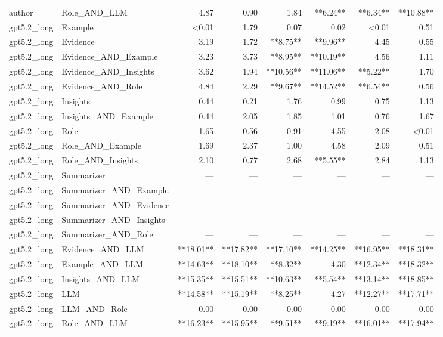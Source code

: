 \begin{tabular}{llrrrrrr}
author & Role_AND_LLM & 4.87 & 0.90 & 1.84 & **6.24** & **6.34** & **10.88** \\
gpt5.2_long & Example & <0.01 & 1.79 & 0.07 & 0.02 & <0.01 & 0.51 \\
gpt5.2_long & Evidence & 3.19 & 1.72 & **8.75** & **9.96** & 4.45 & 0.55 \\
gpt5.2_long & Evidence_AND_Example & 3.23 & 3.73 & **8.95** & **10.19** & 4.56 & 1.11 \\
gpt5.2_long & Evidence_AND_Insights & 3.62 & 1.94 & **10.56** & **11.06** & **5.22** & 1.70 \\
gpt5.2_long & Evidence_AND_Role & 4.84 & 2.29 & **9.67** & **14.52** & **6.54** & 0.56 \\
gpt5.2_long & Insights & 0.44 & 0.21 & 1.76 & 0.99 & 0.75 & 1.13 \\
gpt5.2_long & Insights_AND_Example & 0.44 & 2.05 & 1.85 & 1.01 & 0.76 & 1.67 \\
gpt5.2_long & Role & 1.65 & 0.56 & 0.91 & 4.55 & 2.08 & <0.01 \\
gpt5.2_long & Role_AND_Example & 1.69 & 2.37 & 1.00 & 4.58 & 2.09 & 0.51 \\
gpt5.2_long & Role_AND_Insights & 2.10 & 0.77 & 2.68 & **5.55** & 2.84 & 1.13 \\
gpt5.2_long & Summarizer & — & — & — & — & — & — \\
gpt5.2_long & Summarizer_AND_Example & — & — & — & — & — & — \\
gpt5.2_long & Summarizer_AND_Evidence & — & — & — & — & — & — \\
gpt5.2_long & Summarizer_AND_Insights & — & — & — & — & — & — \\
gpt5.2_long & Summarizer_AND_Role & — & — & — & — & — & — \\
gpt5.2_long & Evidence_AND_LLM & **18.01** & **17.82** & **17.10** & **14.25** & **16.95** & **18.31** \\
gpt5.2_long & Example_AND_LLM & **14.63** & **18.10** & **8.32** & 4.30 & **12.34** & **18.32** \\
gpt5.2_long & Insights_AND_LLM & **15.35** & **15.51** & **10.63** & **5.54** & **13.14** & **18.85** \\
gpt5.2_long & LLM & **14.58** & **15.19** & **8.25** & 4.27 & **12.27** & **17.71** \\
gpt5.2_long & LLM_AND_Role & 0.00 & 0.00 & 0.00 & 0.00 & 0.00 & 0.00 \\
gpt5.2_long & Role_AND_LLM & **16.23** & **15.95** & **9.51** & **9.19** & **16.01** & **17.94** \\

\end{tabular}
